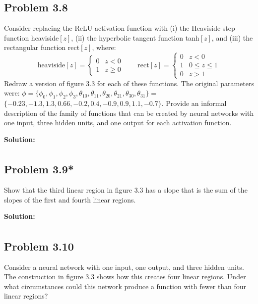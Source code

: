 \documentclass{article}
\begin{document}
    \subsection*{Problem 3.8}
    Consider replacing the ReLU activation function with (i) the Heaviside step function heaviside$[z]$, (ii) the hyperbolic tangent function tanh$[z]$, and (iii) the rectangular function rect$[z]$, where:
    \begin{equation}
        \text{heaviside}[z] = \begin{cases}
            0 & z < 0 \\
            1 & z \geq 0
        \end{cases}
        \qquad
        \text{rect}[z] = \begin{cases}
            0 & z < 0 \\
            1 & 0 \leq z \leq 1 \\
            0 & z > 1
        \end{cases}
        \tag{3.15}
    \end{equation}
    Redraw a version of figure 3.3 for each of these functions. The original parameters were: 
    $\phi = \{\phi_0, \phi_1, \phi_2, \phi_3, \theta_{10}, \theta_{11}, \theta_{20}, \theta_{21}, \theta_{30}, \theta_{31}\} =$ \\
    $\{-0.23, -1.3, 1.3, 0.66, -0.2, 0.4, -0.9, 0.9, 1.1, -0.7\}$. Provide an informal description of the family of functions that can be created by neural networks with one input, three hidden units, and one output for each activation function.

        \vspace{1cm}
        \textbf{Solution:}
        \begin{align*}
        \end{align*}

    \subsection*{Problem 3.9*}
    Show that the third linear region in figure 3.3 has a slope that is the sum of the slopes of the first and fourth linear regions.

        \vspace{1cm}
        \textbf{Solution:}
        \begin{align*}
        \end{align*}

    \subsection*{Problem 3.10}
    Consider a neural network with one input, one output, and three hidden units. The construction in figure 3.3 shows how this creates four linear regions. Under what circumstances could this network produce a function with fewer than four linear regions?
\end{document}
